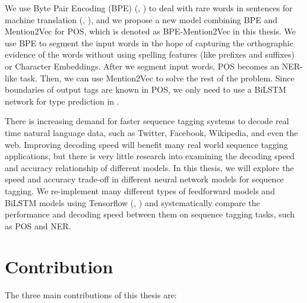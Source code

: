 We use Byte Pair Encoding (BPE) (\citeauthor{gage1994new}, \citeyear{gage1994new}) to deal with rare words in sentences for machine translation (\citeauthor{sennrich2015neural}, \citeyear{sennrich2015neural}), and we propose a new model combining BPE and Mention2Vec for POS, which is denoted as BPE-Mention2Vec in this thesis. We use BPE to segment the input words in the hope of capturing the orthographic evidence of the words without using spelling features (like prefixes and suffixes) or Character Embeddings. After we segment input words, POS becomes an NER-like task. Then, we can use Mention2Vec to solve the rest of the problem. Since boundaries of output tags are known in POS, we only need to use a BiLSTM network for type prediction in \mb.

There is increasing demand for faster sequence tagging systems to decode real time natural language data, such as Twitter, Facebook, Wikipedia, and even the web. Improving decoding speed will benefit many real world sequence tagging applications, but there is very little research into examining the decoding speed and accuracy relationship of different models. In this thesis, we will explore the speed and accuracy trade-off in different neural network models for sequence tagging. We re-implement many different types of feedforward models and BiLSTM models using Tensorflow (\citeauthor{abadi2016tensorflow}, \citeyear{abadi2016tensorflow}) and systematically compare the performance and decoding speed between them on sequence tagging tasks, such as POS and NER.

\section{Contribution}
The three main contributions of this thesis are:

